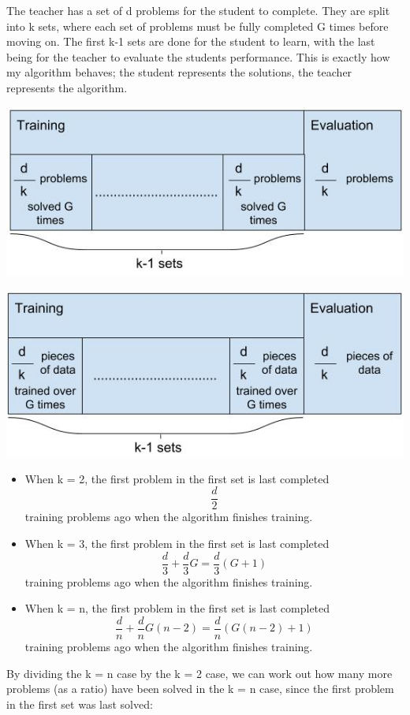 The teacher has a set of d problems for the student to complete. They are split into k sets, where each set of problems must be fully completed G times before moving on. The first k-1 sets are done for the student to learn, with the last being for the teacher to evaluate the students performance. This is exactly how my algorithm behaves; the student represents the solutions, the teacher represents the algorithm. \newline

\hspace{-18pt} \includegraphics[width=\textwidth]{images/drawing-analogy.jpg}

\hspace{-18pt} \includegraphics[width=\textwidth]{images/drawing-system.jpg}

\begin{itemize}
    \item When k = 2, the first problem in the first set is last completed 
    \begin{equation}
        \frac{d}{2}
    \end{equation}
    training problems ago when the algorithm finishes training.
    \item When k = 3, the first problem in the first set is last completed 
    \begin{equation}
       \frac{d}{3} + \frac{d}{3}G = \frac{d}{3}(G + 1)
    \end{equation}
    training problems ago when the algorithm finishes training.
    \vspace{20mm}
    \item When k = n, the first problem in the first set is last completed
    \begin{equation}
        \frac{d}{n} + \frac{d}{n}G(n-2) = \frac{d}{n}(G(n - 2) + 1)
    \end{equation}
    training problems ago when the algorithm finishes training.
\end{itemize}
  By dividing the k = n case by the k = 2 case, we can work out how many more problems (as a ratio) have been solved in the k = n case, since the first problem in the first set was last solved:


